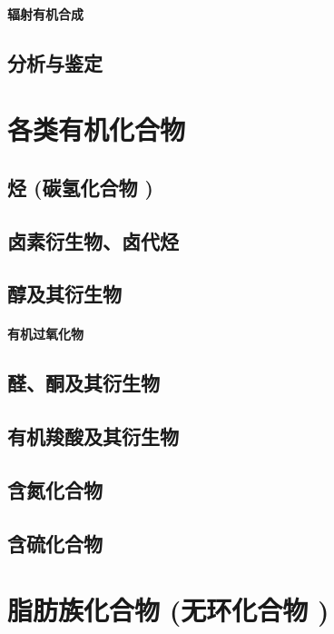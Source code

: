 \documentclass[UTF8]{../03-Chemistry}
\begin{document}
        \subsubsection{辐射有机合成}
\section{分析与鉴定}









\chapter{各类有机化合物}
\section{烃 (碳氢化合物 )}
\section{卤素衍生物、卤代烃}
\section{醇及其衍生物}
    \subsubsection{有机过氧化物}
\section{醛、酮及其衍生物}
\section{有机羧酸及其衍生物}
\section{含氮化合物}
\section{含硫化合物}







\chapter{脂肪族化合物 (无环化合物 )}
\end{document}
